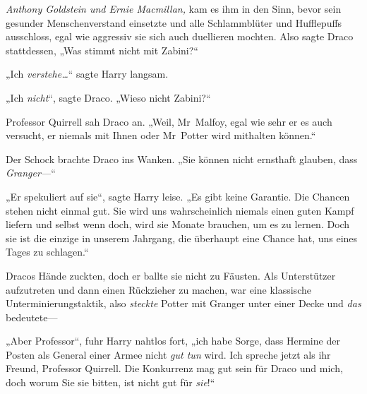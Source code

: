 \emph{Anthony Goldstein und Ernie Macmillan,} kam es ihm in den Sinn, bevor sein gesunder Menschenverstand einsetzte und alle Schlammblüter und Hufflepuffs ausschloss, egal wie aggressiv sie sich auch duellieren mochten. Also sagte Draco stattdessen, „Was stimmt nicht mit Zabini?“

„Ich \emph{verstehe…}“ sagte Harry langsam.

„Ich \emph{nicht}“, sagte Draco. „Wieso nicht Zabini?“

Professor Quirrell sah Draco an. „Weil, Mr~Malfoy, egal wie sehr er es auch versucht, er niemals mit Ihnen oder Mr~Potter wird mithalten können.“

Der Schock brachte Draco ins Wanken. „Sie können nicht ernsthaft glauben, dass \emph{Granger—}“

„Er spekuliert auf sie“, sagte Harry leise. „Es gibt keine Garantie. Die Chancen stehen nicht einmal gut. Sie wird uns wahrscheinlich niemals einen guten Kampf liefern und selbst wenn doch, wird sie Monate brauchen, um es zu lernen. Doch sie ist die einzige in unserem Jahrgang, die überhaupt eine Chance hat, uns eines Tages zu schlagen.“

Dracos Hände zuckten, doch er ballte sie nicht zu Fäusten. Als Unterstützer aufzutreten und dann einen Rückzieher zu machen, war eine klassische Unterminierungstaktik, also \emph{steckte} Potter mit Granger unter einer Decke und \emph{das} bedeutete—

„Aber Professor“, fuhr Harry nahtlos fort, „ich habe Sorge, dass Hermine der Posten als General einer Armee nicht \emph{gut tun} wird. Ich spreche jetzt als ihr Freund, Professor Quirrell. Die Konkurrenz mag gut sein für Draco und mich, doch worum Sie sie bitten, ist nicht gut für \emph{sie}!“

